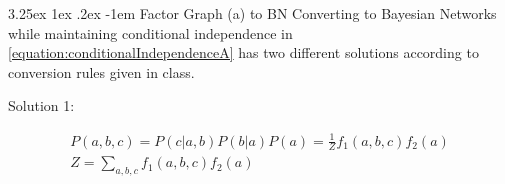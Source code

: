\documentclass[a4paper,12pt]{article}
\makeatletter
\renewcommand\paragraph{\@startsection{paragraph}{5}{\z@}%
  {3.25ex \@plus1ex \@minus.2ex}%
  {-1em}%
  {\normalfont\normalsize\bfseries}}
\makeatother
\begin{document}
\paragraph{Factor Graph (a) to BN}
Converting to Bayesian Networks while maintaining conditional independence in \ref{equation:conditionalIndependenceA} has two different solutions according to conversion rules given in class.  

Solution 1:
\begin{figure}[!htb]
\centering
{}
\end{figure}
%
\begin{equation}
\label{equation:conditionalIndependenceBNaSolution1}
\begin{split}
P(a,b,c) = P(c|a,b)P(b|a)P(a) = \frac{1}{Z} f_{1}(a,b,c)f_{2}(a) \\
Z = \sum_{a,b,c} f_{1}(a,b,c)f_{2}(a) \\
\end{split}
\end{equation}
%
\end{document}
